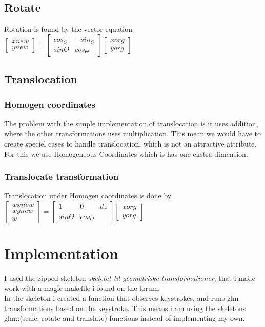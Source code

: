 \documentclass{article}
\begin{document}
\subsection{Rotate}

Rotation is found by the vector equation\\
$
\begin{bmatrix} xnew \\ ynew \end{bmatrix} =
\begin{bmatrix} cos_{\Theta} & -sin_{\Theta} \\ sin{\Theta} & cos_{\Theta} \end{bmatrix} 
\begin{bmatrix} xorg \\ yorg \end{bmatrix}
$\\
\subsection{Translocation}

\subsubsection{Homogen coordinates}
The problem with the simple implementation of translocation is
it uses addition, where the other transformations uses multiplication.
This mean we would have to create speciel cases to handle translocation,
which is not an attractive attribute. 
For this we use Homogeneous Coordinates which is has one ekstra dimension. 

\subsubsection{Translocate transformation}
Translocation under Homogen coordinates is done by\\
$\begin{bmatrix} wxnew \\ wynew \\ w \end{bmatrix} =
\begin{bmatrix} 1 & 0 & d_{x} \\ sin{\Theta} & cos_{\Theta} \end{bmatrix} 
\begin{bmatrix} xorg \\ yorg \end{bmatrix}$

\section{Implementation}
I used the zipped skeleton \emph{skeletet til geometriske transformationer},
that i made work with a magic makefile i found on the forum.\\
In the skeleton i created a function that observes keystrokes, and
runs glm transformations based on the keystroke. This means i am
using the skeletons glm::(scale, rotate and translate) functions
instead of implementing my own.
\end{document}
